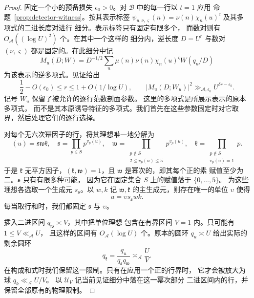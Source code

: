 \begin{proof}
固定一个小的预备损失 $\epsilon_0>0$。对 $\mathcal B$ 中的每一行以 $t=1$ 应用
命题~\ref{prop:detector-witness}。按其表示标签
$\psi_{u,\nu,\varsigma}(n)=\nu(n)\chi_n(u)^{\varsigma}$ 及其多项式的二进长度对进行
细分。表示标签只有固定有限多个，
而数对则有 $O_{\mathcal A}((\log U)^2)$ 个。在其中一个这样的
细分内，逆长度 $D=U^r$ 与数对 $(\nu,\varsigma)$
都是固定的。在此细分中记
\[
 M_u(D;W)=D^{-1/2}\sum_n\mu(n)\nu(n)\chi_n(u)^{\varsigma}W(q_n/D)
\]
为该表示的逆多项式。见证给出
\begin{equation}\label{eq:sextic-witness-spike}
 \frac12-O(\epsilon_0)\le r\le1+O(1/\log U),
 \qquad |M_u(D;W_u)|^2\gg_{\mathcal A,\epsilon_0}
       U^{\delta r-\epsilon_0}.
\end{equation}
记号 $W_u$ 保留了被允许的逐行范数剖面参数。
这里的多项式是所展示表示的原本多项式，
而不是其本原诱导特征的多项式。我们首先在这些参数固定时对它取
界，然后处理它们的逐行选择。

对每个无六次幂因子的行，将其理想唯一地分解为
\[
 (u)=\mathfrak s\mathfrak w\mathfrak k,
 \quad
 \mathfrak s=\prod_{p\in S}p^{v_p(u)},\quad
 \mathfrak w=\prod_{\substack{p\notin S\\2\le v_p(u)\le5}}p^{v_p(u)},
 \quad
 \mathfrak k=\prod_{\substack{p\notin S\\v_p(u)=1}}p.
\]
于是 $\mathfrak k$ 无平方因子，$(\mathfrak k,\mathfrak w)=1$，且
$\mathfrak w$ 是幂次的，即其每个正的素
赋值至少为二。$\mathfrak s$ 只有有限多种可能，
因为它在固定集合 $S$ 上的赋值落于 $\{0,\ldots,5\}$。
为这些理想各选取一个生成元 $s_{\mathfrak s}$。以 $w,k$ 记
$\mathfrak w,\mathfrak k$ 的主生成元，则存在唯一的单位 $\upsilon$ 使得
\[
 u=\upsilon s_{\mathfrak s}wk.
\]
每当取行和时，我们都固定 $\mathfrak s$ 与 $\upsilon$。

插入二进区间 $q_{\mathfrak w}\asymp V$，其中把单位理想
包含在有界区间 $V=1$ 内。只可能有 $1\le V\ll_{\mathcal A}U$，
且这样的区间有 $O_{\mathcal A}(\log U)$ 个。原本的圆环
$q_u\asymp U$ 给出实际的剩余圆环
\begin{equation}\label{eq:sextic-actual-row-annulus}
 q_{\mathfrak k}=\frac{q_u}{q_{\mathfrak s}q_{\mathfrak w}}
       \asymp_{\mathcal A}\frac UV.
\end{equation}
在构成和式时我们保留这一限制。只有在应用一个正的行界时，
它才会被放大为球 $q_k\ll_{\mathcal A}U/V$。
以 $\mathcal U_V$ 记当前见证细分中落在这一幂次部分
二进区间内的行，并保留全部原有的物理限制。


\end{proof}
